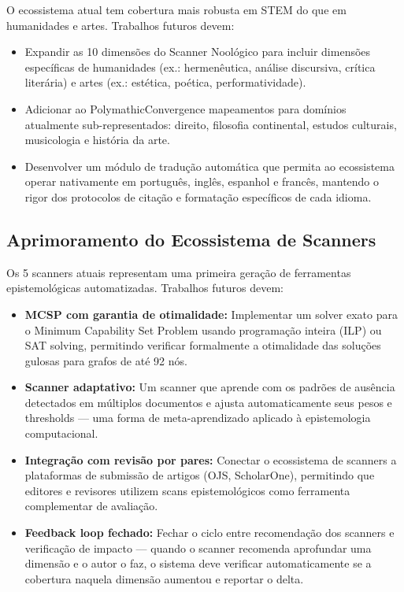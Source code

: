 O ecossistema atual tem cobertura mais robusta em STEM do que em humanidades e artes. Trabalhos futuros devem:

\begin{itemize}
  \item Expandir as 10 dimensões do Scanner Noológico para incluir dimensões específicas de humanidades (ex.: hermenêutica, análise discursiva, crítica literária) e artes (ex.: estética, poética, performatividade).
  \item Adicionar ao PolymathicConvergence mapeamentos para domínios atualmente sub-representados: direito, filosofia continental, estudos culturais, musicologia e história da arte.
  \item Desenvolver um módulo de tradução automática que permita ao ecossistema operar nativamente em português, inglês, espanhol e francês, mantendo o rigor dos protocolos de citação e formatação específicos de cada idioma.
\end{itemize}

\subsection{Aprimoramento do Ecossistema de Scanners}

Os 5 scanners atuais representam uma primeira geração de ferramentas epistemológicas automatizadas. Trabalhos futuros devem:

\begin{itemize}
  \item \textbf{MCSP com garantia de otimalidade:} Implementar um solver exato para o Minimum Capability Set Problem usando programação inteira (ILP) ou SAT solving, permitindo verificar formalmente a otimalidade das soluções gulosas para grafos de até 92 nós.
  \item \textbf{Scanner adaptativo:} Um scanner que aprende com os padrões de ausência detectados em múltiplos documentos e ajusta automaticamente seus pesos e thresholds --- uma forma de meta-aprendizado aplicado à epistemologia computacional.
  \item \textbf{Integração com revisão por pares:} Conectar o ecossistema de scanners a plataformas de submissão de artigos (OJS, ScholarOne), permitindo que editores e revisores utilizem scans epistemológicos como ferramenta complementar de avaliação.
  \item \textbf{Feedback loop fechado:} Fechar o ciclo entre recomendação dos scanners e verificação de impacto --- quando o scanner recomenda aprofundar uma dimensão e o autor o faz, o sistema deve verificar automaticamente se a cobertura naquela dimensão aumentou e reportar o delta.
\end{itemize}

